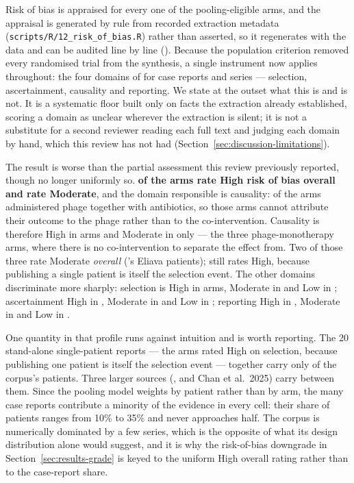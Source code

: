 Risk of bias is appraised for every one of the \ArmsAnalysed pooling-eligible arms, and the appraisal is generated by rule from recorded extraction metadata (\texttt{scripts/R/12\_risk\_of\_bias.R}) rather than asserted, so it regenerates with the data and can be audited line by line (). Because the population criterion removed every randomised trial from the synthesis, a single instrument now applies throughout: the four domains of \textcite{Murad2018_casereports} for case reports and series --- selection, ascertainment, causality and reporting. We state at the outset what this is and is not. It is a systematic floor built only on facts the extraction already established, scoring a domain as unclear wherever the extraction is silent; it is not a substitute for a second reviewer reading each full text and judging each domain by hand, which this review has not had (Section~\ref{sec:discussion-limitations}).

The result is worse than the partial assessment this review previously reported, though no longer uniformly so. \textbf{\RobOverallHigh of the \ArmsAnalysed arms rate High risk of bias overall and \RobOverallModerate rate Moderate}, and the domain responsible is causality: \ModPhageAntibioticCombinationArms of the \ArmsAnalysed arms administered phage together with antibiotics, so those arms cannot attribute their outcome to the phage rather than to the co-intervention. Causality is therefore High in \RobCausalityHigh arms and Moderate in only \RobCausalityModerate  --- the three phage-monotherapy arms, where there is no co-intervention to separate the effect from. Two of those three rate Moderate \emph{overall} (\citeauthor{Zaldastanishvili2021_viruses}'s Eliava patients); \textcite{Arya2026_pji_natcomms} still rates High, because publishing a single patient is itself the selection event. The other domains discriminate more sharply: selection is High in \RobSelectionHigh arms, Moderate in \RobSelectionModerate and Low in \RobSelectionLow ; ascertainment High in \RobAscertainmentHigh , Moderate in \RobAscertainmentModerate and Low in \RobAscertainmentLow ; reporting High in \RobReportingHigh , Moderate in \RobReportingModerate and Low in \RobReportingLow .

One quantity in that profile runs against intuition and is worth reporting. The 20 stand-alone single-patient reports --- the arms rated High on selection, because publishing one patient is itself the selection event --- together carry only \SinglePatientPatients of the corpus's \PatientsAnalysed patients. Three larger sources (\citeauthor{Pirnay2024_natmicrobiol}, \citeauthor{Onallah2023_med} and Chan et al.\ 2025) carry \TopThreeStudiesPatients between them. Since the pooling model weights by patient rather than by arm, the many case reports contribute a minority of the evidence in every cell: their share of patients ranges from 10\% to 35\% and never approaches half. The corpus is numerically dominated by a few series, which is the opposite of what its design distribution alone would suggest, and it is why the risk-of-bias downgrade in Section~\ref{sec:results-grade} is keyed to the uniform High overall rating rather than to the case-report share.

